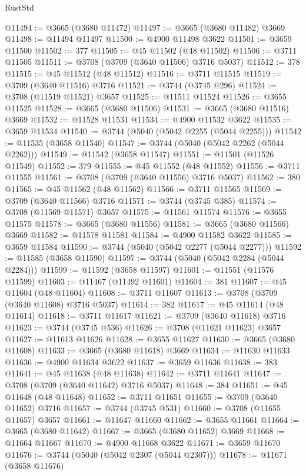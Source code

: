\begin{lexlean}{RustStd}
\begin{coremodule}
@11494 := @3665 (@3680 @11472)
@11497 := @3665 (@3680 @11482) @3669
@11498 := @11494 @11497
@11500 := @4900 @11498 @3622
@11501 := @3659 @11500
@11502 := 377
@11505 := @45 @11502 (@48 @11502)
@11506 := @3711 @11505
@11511 := @3708 (@3709 (@3640 @11506) @3716 @5037)
@11512 := 378
@11515 := @45 @11512 (@48 @11512)
@11516 := @3711 @11515
@11519 := @3709 (@3640 @11516) @3716
@11521 := @3744 (@3745 @296)
@11524 := @3708 (@11519 @11521) @3657
@11525 := @11511 @11524
@11526 := @3655 @11525
@11528 := @3665 (@3680 @11506)
@11531 := @3665 (@3680 @11516) @3669
@11532 := @11528 @11531
@11534 := @4900 @11532 @3622
@11535 := @3659 @11534
@11540 := @3744 (@5040 (@5042 @2255 (@5044 @2255)))
@11542 := @11535 (@3658 @11540)
@11547 := @3744 (@5040 (@5042 @2262 (@5044 @2262)))
@11549 := @11542 (@3658 @11547)
@11551 := @11501 (@11526 @11549)
@11552 := 379
@11555 := @45 @11552 (@48 @11552)
@11556 := @3711 @11555
@11561 := @3708 (@3709 (@3640 @11556) @3716 @5037)
@11562 := 380
@11565 := @45 @11562 (@48 @11562)
@11566 := @3711 @11565
@11569 := @3709 (@3640 @11566) @3716
@11571 := @3744 (@3745 @385)
@11574 := @3708 (@11569 @11571) @3657
@11575 := @11561 @11574
@11576 := @3655 @11575
@11578 := @3665 (@3680 @11556)
@11581 := @3665 (@3680 @11566) @3669
@11582 := @11578 @11581
@11584 := @4900 @11582 @3622
@11585 := @3659 @11584
@11590 := @3744 (@5040 (@5042 @2277 (@5044 @2277)))
@11592 := @11585 (@3658 @11590)
@11597 := @3744 (@5040 (@5042 @2284 (@5044 @2284)))
@11599 := @11592 (@3658 @11597)
@11601 := @11551 (@11576 @11599)
@11603 := @11467 (@11492 @11601)
@11604 := 381
@11607 := @45 @11604 (@48 @11604)
@11608 := @3711 @11607
@11613 := @3708 (@3709 (@3640 @11608) @3716 @5037)
@11614 := 382
@11617 := @45 @11614 (@48 @11614)
@11618 := @3711 @11617
@11621 := @3709 (@3640 @11618) @3716
@11623 := @3744 (@3745 @536)
@11626 := @3708 (@11621 @11623) @3657
@11627 := @11613 @11626
@11628 := @3655 @11627
@11630 := @3665 (@3680 @11608)
@11633 := @3665 (@3680 @11618) @3669
@11634 := @11630 @11633
@11636 := @4900 @11634 @3622
@11637 := @3659 @11636
@11638 := 383
@11641 := @45 @11638 (@48 @11638)
@11642 := @3711 @11641
@11647 := @3708 (@3709 (@3640 @11642) @3716 @5037)
@11648 := 384
@11651 := @45 @11648 (@48 @11648)
@11652 := @3711 @11651
@11655 := @3709 (@3640 @11652) @3716
@11657 := @3744 (@3745 @531)
@11660 := @3708 (@11655 @11657) @3657
@11661 := @11647 @11660
@11662 := @3655 @11661
@11664 := @3665 (@3680 @11642)
@11667 := @3665 (@3680 @11652) @3669
@11668 := @11664 @11667
@11670 := @4900 @11668 @3622
@11671 := @3659 @11670
@11676 := @3744 (@5040 (@5042 @2307 (@5044 @2307)))
@11678 := @11671 (@3658 @11676)

\end{coremodule}
\end{lexlean}
